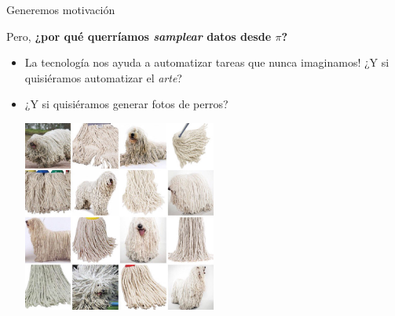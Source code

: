 \documentclass[aspectratio=169,xcolor=dvipsnames, t, spanish]{beamer}
\begin{document}
\begin{frame}{Generemos motivación}
\begin{center}
    Pero, \textbf{¿por qué querríamos \textit{samplear} datos desde $\pi$?}
\end{center}
\begin{itemize}
        \item La tecnología nos ayuda a automatizar tareas que nunca imaginamos! ¿Y si quisiéramos automatizar el \textit{arte}?
        \pause

        \item ¿Y si quisiéramos generar fotos de perros?\vspace{2mm}\pause
        \begin{center}
            \includegraphics[width=0.5\textwidth,trim={0cm 12.5cm 0cm 0cm},clip]{figures/PerrosMopas.jpg}
        \end{center}
    \end{itemize}
\end{frame}
\end{document}
